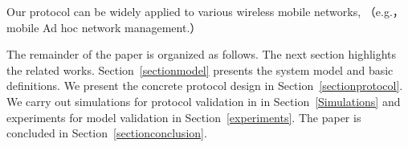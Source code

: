 Our protocol can be widely applied to various wireless mobile networks, （e.g.， mobile Ad hoc network management.）


The remainder of the paper is organized as follows. 
The next section highlights the related works.
Section~\ref{sectionmodel} presents the system model and basic definitions.
We present the concrete protocol design
in Section~\ref{sectionprotocol}. 
We carry out simulations for protocol validation in in Section~\ref{Simulations}
and experiments for model validation in Section~\ref{experiments}.
The paper is concluded in Section~\ref{sectionconclusion}.
